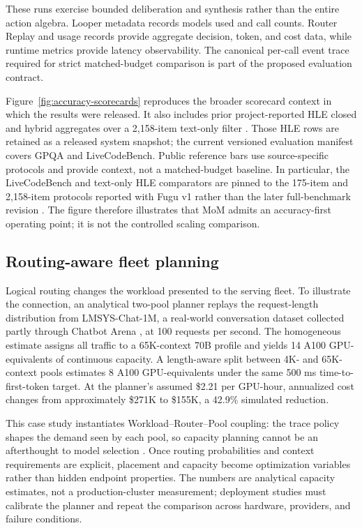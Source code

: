 These runs exercise bounded deliberation and synthesis rather than the entire
action algebra. Looper metadata records models used and call counts. Router
Replay and usage records provide aggregate decision, token, and cost data,
while runtime metrics provide latency observability. The canonical per-call
event trace required for strict matched-budget comparison is part of the
proposed evaluation contract.

Figure~\ref{fig:accuracy-scorecards} reproduces the broader scorecard context in
which the results were released. It also includes prior project-reported HLE
closed and hybrid aggregates over a 2,158-item text-only filter
\citep{phan_2026_hle}. Those HLE rows are retained as a released system snapshot;
the current versioned evaluation manifest covers GPQA and LiveCodeBench. Public
reference bars use source-specific protocols and provide context, not a
matched-budget baseline. In particular, the LiveCodeBench and text-only HLE
comparators are pinned to the 175-item and 2,158-item protocols reported with
Fugu v1 rather than the later full-benchmark revision
\citep{tang_2026_fugu_v1}. The figure therefore illustrates that MoM admits an
accuracy-first operating point; it is not the controlled scaling comparison.

\FloatBarrier
\subsection{Routing-aware fleet planning}

Logical routing changes the workload presented to the serving fleet. To
illustrate the connection, an analytical two-pool planner replays the
request-length distribution from LMSYS-Chat-1M, a real-world conversation
dataset collected partly through Chatbot Arena
\citep{zheng_2023_lmsyschat,chiang_2024_chatbotarena}, at 100 requests per
second. The homogeneous estimate assigns all traffic to a 65K-context 70B
profile and yields 14 A100 GPU-equivalents of continuous capacity. A
length-aware split between 4K- and 65K-context pools estimates 8 A100
GPU-equivalents under the same 500 ms time-to-first-token target. At the
planner's assumed \$2.21 per GPU-hour, annualized cost changes from
approximately \$271K to \$155K, a 42.9\% simulated reduction.

This case study instantiates Workload--Router--Pool coupling: the trace policy
shapes the demand seen by each pool, so capacity planning cannot be an
afterthought to model selection \citep{chen_2026_wrp}. Once routing probabilities
and context requirements are explicit, placement and capacity become
optimization variables rather than hidden endpoint properties. The numbers are
analytical capacity estimates, not a production-cluster measurement;
deployment studies must calibrate the planner and repeat the comparison across
hardware, providers, and failure conditions.

